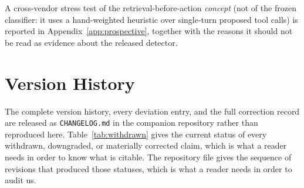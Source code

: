 \documentclass{article}
\begin{document}
A cross-vendor stress test of the retrieval-before-action \emph{concept} (not of the frozen classifier: it uses a hand-weighted heuristic over single-turn proposed tool calls) is reported in Appendix~\ref{app:prospective}, together with the reasons it should not be read as evidence about the released detector.

\section{Version History}
\label{app:version-history}
The complete version history, every deviation entry, and the full correction record are
released as \texttt{CHANGELOG.md} in the companion repository rather than reproduced here.
Table~\ref{tab:withdrawn} gives the current status of every withdrawn, downgraded, or
materially corrected claim, which is what a reader needs in order to know what is citable.
The repository file gives the sequence of revisions that produced those statuses, which is
what a reader needs in order to audit us.
\end{document}

